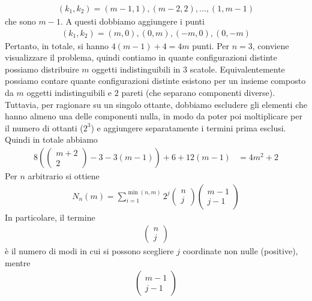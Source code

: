 \documentclass[twoside, 11pt]{amsbook}
\makeatletter
\newcommand{\0}{{(0)}}
\newcommand{\3}{{(3)}}
\theoremstyle{colonplain}
\theoremstyle{colondefinition}
\theoremstyle{colonremark}
\numberwithin{equation}{chapter}
\renewcommand{\proofname}{Dimostrazione}
\renewenvironment{proof}[1][\proofname]{\par
  \pushQED{\qed}%
  \normalfont \topsep6\p@\@plus6\p@\relax
  \trivlist
  \item[\hskip\labelsep\bfseries #1:]\ignorespaces
}{%
  \popQED\endtrivlist\@endpefalse
}
\makeatother
\begin{document}
\begin{proof}
\begin{align}
    (k_1, k_2) = (m - 1, 1), (m - 2, 2), \dots, (1, m - 1)
\end{align}
che sono $m - 1$. A questi dobbiamo aggiungere i punti
\begin{align}
    (k_1, k_2) = (m, 0), (0, m), (-m, 0), (0, -m)
\end{align}
Pertanto, in totale, si hanno $4(m - 1) + 4 = 4m$ punti. Per $n = 3$, conviene visualizzare il problema, quindi contiamo in quante configurazioni distinte possiamo distribuire $m$ oggetti indistinguibili in $3$ scatole. Equivalentemente possiamo contare quante configurazioni distinte esistono per un insieme composto da $m$ oggetti indistinguibili e $2$ pareti (che separano componenti diverse). Tuttavia, per ragionare su un singolo ottante, dobbiamo escludere gli elementi che hanno almeno una delle componenti nulla, in modo da poter poi moltiplicare per il numero di ottanti ($2^3$) e aggiungere separatamente i termini prima esclusi. Quindi in totale abbiamo
\begin{align}
    8\left(\begin{pmatrix}
        m + 2 \\
        2
    \end{pmatrix} - 3 - 3(m - 1)\right) + 6 + 12(m - 1) &= 4m^2 + 2
\end{align}
Per $n$ arbitrario si ottiene
\begin{align}
    N_n(m) = \sum_{i = 1}^{\min(n, m)} 2^j\begin{pmatrix}
        n \\
        j
    \end{pmatrix} \begin{pmatrix}
        m - 1 \\
        j - 1
    \end{pmatrix}
\end{align}
In particolare, il termine
\begin{align}
    \begin{pmatrix}
        n \\
        j
    \end{pmatrix}
\end{align}
è il numero di modi in cui si possono scegliere $j$ coordinate non nulle (positive), mentre
\begin{align}
    \begin{pmatrix}
        m - 1 \\
        j - 1
    \end{pmatrix}
\end{align}

\end{proof}
\end{document}
